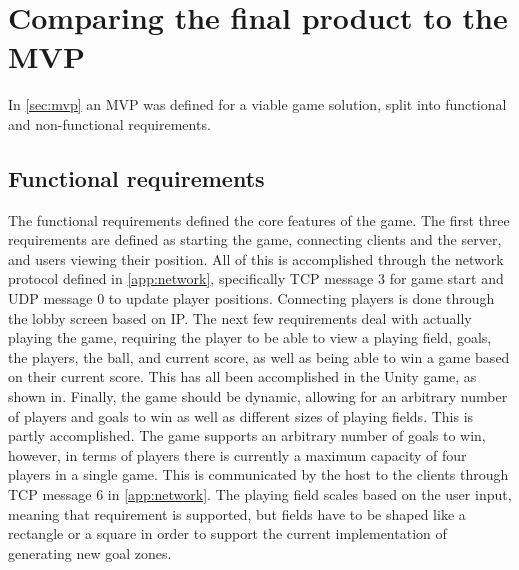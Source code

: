 \section{Comparing the final product to the MVP}
In \autoref{sec:mvp} an MVP was defined for a viable game solution, split into functional and non-functional requirements.

\subsection{Functional requirements}
The functional requirements defined the core features of the game.
The first three requirements are defined as starting the game, connecting clients and the server, and users viewing their position.
All of this is accomplished through the network protocol defined in \autoref{app:network}, specifically TCP message 3 for game start and UDP message 0 to update player positions.
Connecting players is done through the lobby screen based on IP.
The next few requirements deal with actually playing the game, requiring the player to be able to view a playing field, goals, the players, the ball, and current score, as well as being able to win a game based on their current score.
This has all been accomplished in the Unity game, as shown in.
Finally, the game should be dynamic, allowing for an arbitrary number of players and goals to win as well as different sizes of playing fields.
This is partly accomplished.
The game supports an arbitrary number of goals to win, however, in terms of players there is currently a maximum capacity of four players in a single game.
This is communicated by the host to the clients through TCP message 6 in \autoref{app:network}.
The playing field scales based on the user input, meaning that requirement is supported, but fields have to be shaped like a rectangle or a square in order to support the current implementation of generating new goal zones.


